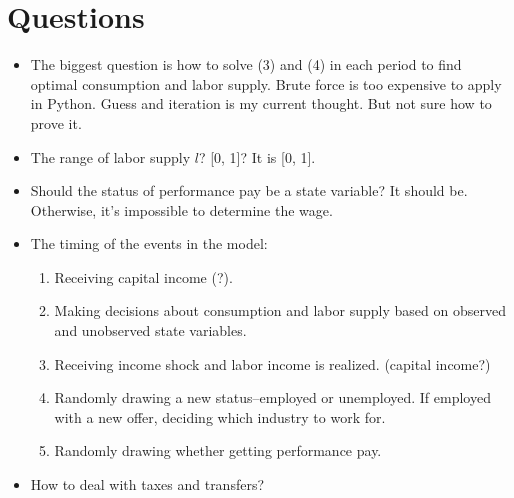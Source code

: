 \documentclass{article}
\begin{document}
\section{Questions}
	\begin{itemize}
		\item The biggest question is how to solve (3) and (4) in each period to find optimal consumption and labor supply. Brute force is too expensive to apply in Python. Guess and iteration is my current thought. But not sure how to prove it. 
		\item The range of labor supply $l$? [0, 1]? It is [0, 1].
		\item Should the status of performance pay be a state variable? It should be. Otherwise, it's impossible to determine the wage.
		\item The timing of the events in the model:
			\begin{enumerate}[{}a{)}]
				\item Receiving capital income (?).
				\item Making decisions about consumption and labor supply based on observed and unobserved state variables.
				\item Receiving income shock and labor income is realized. (capital income?)
				\item Randomly drawing a new status--employed or unemployed. If employed with a new offer, deciding which industry to work for.
				\item Randomly drawing whether getting performance pay.
			\end{enumerate}
		\item How to deal with taxes and transfers?
	\end{itemize}
\end{document}
